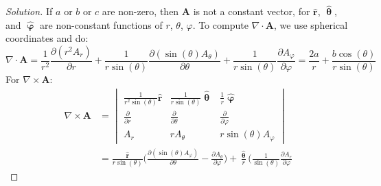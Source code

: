 \documentclass[crop=false,class=book,oneside]{standalone}
\begin{document}
            \begin{proof}[Solution]
                If $a$ or $b$ or $c$ are non-zero,
                then $\mathbf{A}$ is not a constant
                vector, for $\hat{\mathbf{r}}$,
                $\hat{\boldsymbol{\uptheta}}$, and
                $\hat{\boldsymbol{\upvarphi}}$ are
                non-constant functions of
                $r$, $\theta$, $\varphi$.
                To compute $\nabla\cdot\mathbf{A}$,
                we use spherical coordinates and do:
                \begin{equation*}
                    \nabla\cdot\mathbf{A}
                    =\frac{1}{r^{2}}
                    \frac{\partial(r^{2}A_{r})}{\partial{r}}
                    +\frac{1}{r\sin(\theta)}
                    \frac{\partial(\sin(\theta)A_{\theta})}
                         {\partial\theta}
                    +\frac{1}{r\sin(\theta)}
                    \frac{\partial A_{\varphi}}{\partial\varphi}
                    =\frac{2a}{r}
                    +\frac{b\cos(\theta)}{r\sin(\theta)}
                \end{equation*}
                For $\nabla\times\mathbf{A}$:
                \begin{align*}
                    \nabla\times\mathbf{A}
                    &=
                    \begin{vmatrix}
                        \frac{1}{r^{2}\sin(\theta)}\hat{\mathbf{r}}
                        &\frac{1}{r\sin(\theta)}\hat{\boldsymbol{\uptheta}}
                        &\frac{1}{r}\hat{\boldsymbol{\upvarphi}}\\
                        \frac{\partial}{\partial{r}}
                        &\frac{\partial}{\partial\theta}
                        &\frac{\partial}{\partial\varphi}\\
                        A_{r}
                        &rA_{\theta}
                        &r\sin(\theta)A_{\varphi}
                    \end{vmatrix}\\
                    &=\frac{\hat{\mathbf{r}}}{r\sin(\theta)}
                    \bigg(
                        \frac{\partial(\sin(\theta)A_{\varphi})}
                             {\partial\theta}
                        -\frac{\partial{A_{\theta}}}
                              {\partial \varphi}
                    \bigg)
                    +\frac{\hat{\boldsymbol{\uptheta}}}{r}
                    \bigg(
                        \frac{1}{\sin(\theta)}
                        \frac{\partial{A_{r}}}{\partial\varphi}

\end{align*}
\end{proof}
\end{document}
